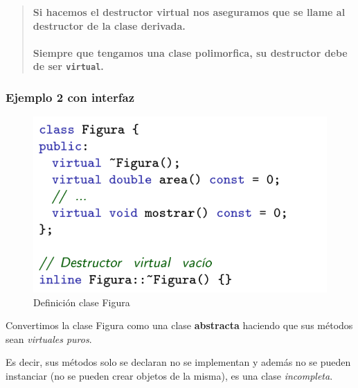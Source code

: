 \begin{center}
	\begin{quote}
	\textbf{Si hacemos el destructor virtual nos aseguramos que se llame al destructor de la clase derivada.\\\\
		Siempre que tengamos una clase polimorfica, su destructor debe de ser \texttt{virtual}.}

\end{quote}
\end{center}

\subsubsection{Ejemplo 2 con interfaz}
\begin{figure}[h]
	\begin{center}
		\includegraphics[width=\textwidth]{Imagenes/poli5.png}
		\caption{Definición clase Figura}
	\end{center}
\end{figure}


Convertimos la clase Figura como una clase \textbf{abstracta} haciendo que sus métodos sean \textit{virtuales puros}.

Es decir, sus métodos solo se declaran no se implementan y además no se pueden instanciar (no se pueden crear objetos de la misma), es una clase \textit{incompleta}.

